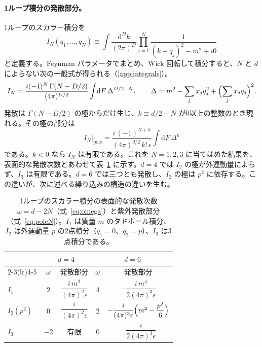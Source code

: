 \documentclass[a4paper,10pt]{ltjsarticle}
\newcommand{\dd}{\mathrm{d}}
\begin{document}
\paragraph{1ループ積分の発散部分。}1ループのスカラー積分を
\begin{equation}
I_N(q_1,\dots,q_N)\equiv\int\frac{\dd^Dk}{(2\pi)^D}\prod_{j=1}^{N}\frac{1}{(k+q_j)^2-m^2+i0}
\label{eq:IN}
\end{equation}
と定義する。Feynman パラメータでまとめ、Wick 回転して積分すると、$N$ と $d$ によらない次の一般式が得られる（\ref{app:integrals}）。
\begin{equation}
I_N=\frac{i(-1)^N\,\Gamma(N-D/2)}{(4\pi)^{D/2}}\int\!\dd F\,\Delta^{D/2-N},\qquad
\Delta=m^2-\sum_j x_jq_j^2+\Bigl(\sum_j x_jq_j\Bigr)^2 .
\label{eq:IN-general}
\end{equation}
発散は $\Gamma(N-D/2)$ の極からだけ生じ、$k\equiv d/2-N$ が0以上の整数のとき現れる。その極の部分は
\begin{equation}
I_N\Big|_{\text{pole}}=\frac{i\,(-1)^{N+k}}{(4\pi)^{d/2}\,k!\,\epsilon}\int\!\dd F\,\Delta^{k}
\label{eq:poleN}
\end{equation}
である。$k<0$ なら $I_N$ は有限である。これを $N=1,2,3$ に当てはめた結果を、表面的な発散次数とあわせて表~\ref{tab:poles} に示す。$d=4$ では $I_2$ の極が外運動量によらず、$I_3$ は有限である。$d=6$ では三つとも発散し、$I_2$ の極は $p^2$ に依存する。この違いが、次に述べる繰り込みの構造の違いを生む。

\begin{table}[tbp]
\centering\small
\caption{1ループのスカラー積分の表面的な発散次数 $\omega=d-2N$（式~\eqref{eq:omega}）と紫外発散部分（式~\eqref{eq:poleN}）。$I_1$ は質量 $m$ のタドポール積分、$I_2$ は外運動量 $p$ の2点積分（$q_1=0$、$q_2=p$）、$I_3$ は3点積分である。}
\label{tab:poles}
\begin{tabular}{lcccc}
\toprule
& \multicolumn{2}{c}{$d=4$} & \multicolumn{2}{c}{$d=6$} \\
\cmidrule(lr){2-3}\cmidrule(lr){4-5}
& $\omega$ & 発散部分 & $\omega$ & 発散部分 \\
\midrule
$I_1$ & $2$ & $\dfrac{i\,m^2}{(4\pi)^2\epsilon}$ & $4$ & $-\dfrac{i\,m^4}{2(4\pi)^3\epsilon}$ \\[2ex]
$I_2(p^2)$ & $0$ & $\dfrac{i}{(4\pi)^2\epsilon}$ & $2$ & $-\dfrac{i}{(4\pi)^3\epsilon}\Bigl(m^2-\dfrac{p^2}{6}\Bigr)$ \\[2ex]
$I_3$ & $-2$ & 有限 & $0$ & $-\dfrac{i}{2(4\pi)^3\epsilon}$ \\
\bottomrule
\end{tabular}
\end{table}
\end{document}
